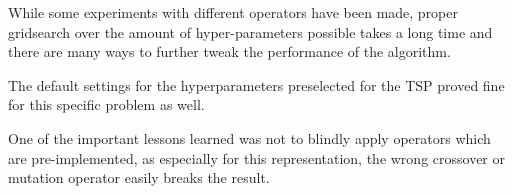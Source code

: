 \documentclass[10pt]{scrartcl}
\begin{document}
While some experiments with different operators have been made, proper gridsearch over the amount of hyper-parameters possible takes a long time and there are many ways to further tweak the performance of the algorithm.

The default settings for the hyperparameters preselected for the TSP proved fine for this specific problem as well.

One of the important lessons learned was not to blindly apply operators which are pre-implemented, as especially for this representation, the wrong crossover or mutation operator easily breaks the result.






\end{document}
